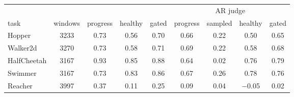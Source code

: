 \begin{tabular}{@{}lcccccccc@{}}
\toprule
 & & \multicolumn{3}{c}{\kev{}} & \multicolumn{4}{c}{AR judge} \\ \cmidrule(lr){3-5}\cmidrule(l){6-9}
task & windows & progress & healthy & gated & progress & sampled & healthy & gated \\ \midrule
Hopper & 3233 & 0.73 & 0.56 & 0.70 & 0.66 & 0.22 & 0.50 & 0.65 \\
Walker2d & 3270 & 0.73 & 0.58 & 0.71 & 0.69 & 0.22 & 0.58 & 0.68 \\
HalfCheetah & 3167 & 0.93 & 0.85 & 0.88 & 0.64 & 0.02 & 0.76 & 0.79 \\
Swimmer & 3167 & 0.73 & 0.83 & 0.86 & 0.67 & 0.26 & 0.78 & 0.76 \\
Reacher & 3997 & 0.37 & 0.11 & 0.25 & 0.09 & 0.04 & $-$0.05 & 0.02 \\
\bottomrule
\end{tabular}
